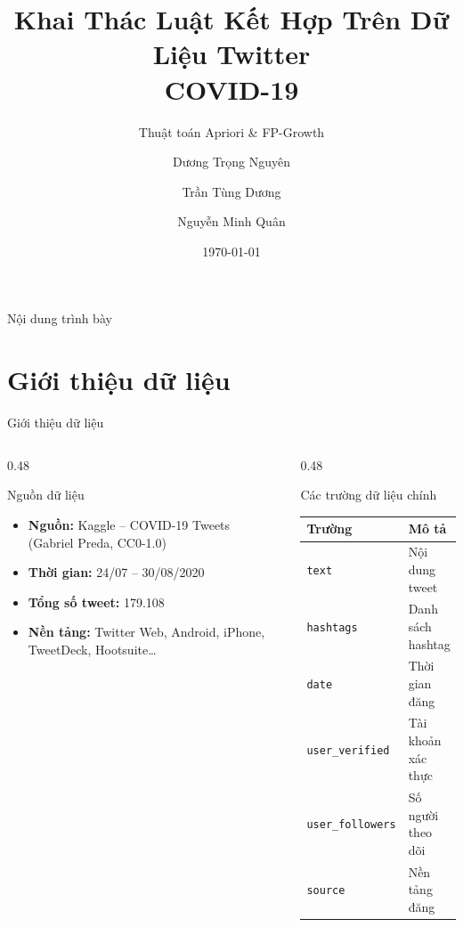 \documentclass[aspectratio=169]{beamer}
\title[Khai thác luật kết hợp -- COVID-19]{%
  \textbf{Khai Thác Luật Kết Hợp Trên Dữ Liệu Twitter\\COVID-19}
}
\subtitle{Thuật toán Apriori \& FP-Growth}
\author[Nhóm 3]{%
  Dương Trọng Nguyên \and Trần Tùng Dương \and Nguyễn Minh Quân
}
\institute[]{Môn học: Khai phá dữ liệu}
\date{\today}
\begin{document}
{
  \begin{frame}[plain]
    \titlepage
  \end{frame}
}

\begin{frame}{Nội dung trình bày}
  \tableofcontents
\end{frame}

\section{Giới thiệu dữ liệu}

\begin{frame}{Giới thiệu dữ liệu}
  \begin{columns}[T]
    \begin{column}{0.48\textwidth}
      \begin{block}{Nguồn dữ liệu}
        \begin{itemize}
          \item \textbf{Nguồn:} Kaggle -- COVID-19 Tweets\\
                {\small (Gabriel Preda, CC0-1.0)}
          \item \textbf{Thời gian:} 24/07 -- 30/08/2020
          \item \textbf{Tổng số tweet:} 179.108
          \item \textbf{Nền tảng:} Twitter Web, Android, iPhone, TweetDeck, Hootsuite\ldots
        \end{itemize}
      \end{block}
    \end{column}
    \begin{column}{0.48\textwidth}
      \begin{block}{Các trường dữ liệu chính}
        \begin{tabular}{ll}
          \toprule
          \textbf{Trường} & \textbf{Mô tả} \\
          \midrule
          \texttt{text}         & Nội dung tweet \\
          \texttt{hashtags}     & Danh sách hashtag \\
          \texttt{date}         & Thời gian đăng \\
          \texttt{user\_verified} & Tài khoản xác thực \\
          \texttt{user\_followers} & Số người theo dõi \\
          \texttt{source}       & Nền tảng đăng \\
          \bottomrule
        \end{tabular}
      \end{block}
    \end{column}
  \end{columns}
\end{frame}
\end{document}
